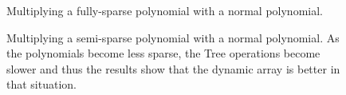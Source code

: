 \documentclass[journal,article,submit,moreauthors,algorithms]{Definitions/mdpi}
\begin{document}
\begin{figure}[H] 
\centering
{}
\hfil
{}
\caption{Multiplying a fully-sparse polynomial with a normal polynomial.}
\label{fig:6}
\end{figure}


\begin{figure}[H] 
\centering
{}
\hfil
{}
\caption{Multiplying a semi-sparse polynomial with a normal polynomial. As the polynomials become less sparse, the Tree operations become slower and thus the results show that the dynamic array is better in that situation.}
\label{fig:7}
\end{figure}
\end{document}
